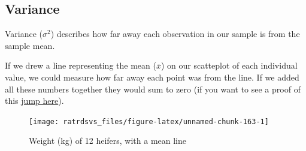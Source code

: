\documentclass[
]{book}
\newenvironment{Shaded}{\begin{snugshade}}{\end{snugshade}}
\newcommand{\DataTypeTok}[1]{\textcolor[rgb]{0.13,0.29,0.53}{#1}}
\newcommand{\DecValTok}[1]{\textcolor[rgb]{0.00,0.00,0.81}{#1}}
\newcommand{\FloatTok}[1]{\textcolor[rgb]{0.00,0.00,0.81}{#1}}
\newcommand{\KeywordTok}[1]{\textcolor[rgb]{0.13,0.29,0.53}{\textbf{#1}}}
\newcommand{\NormalTok}[1]{#1}
\newcommand{\OperatorTok}[1]{\textcolor[rgb]{0.81,0.36,0.00}{\textbf{#1}}}
\newcommand{\StringTok}[1]{\textcolor[rgb]{0.31,0.60,0.02}{#1}}
\begin{document}
\hypertarget{stats_variance}{%
\subsection{Variance}\label{stats_variance}}

Variance (\(\sigma^2\)) describes how far away each observation in our sample is from the sample mean.

If we drew a line representing the mean (\(\overline{x}\)) on our scatteplot of each individual value, we could measure how far away each point was from the line. If we added all these numbers together they would sum to zero (if you want to see a proof of this \protect\hyperlink{stats_proofvariance}{jump here}).

\begin{Shaded}
\end{Shaded}

\begin{figure}

{\centering \texttt{[image: ratrdsvs\_files/figure-latex/unnamed-chunk-163-1]} 

}

\caption{Weight (kg) of 12 heifers, with a mean line}\label{fig:unnamed-chunk-163}
\end{figure}
\end{document}
